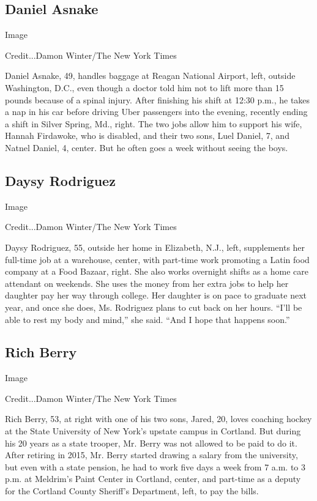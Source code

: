 \hypertarget{daniel-asnake}{%
\subsection{Daniel Asnake}\label{daniel-asnake}}

Image

Credit...Damon Winter/The New York Times

Daniel Asnake, 49, handles baggage at Reagan National Airport, left,
outside Washington, D.C., even though a doctor told him not to lift more
than 15 pounds because of a spinal injury. After finishing his shift at
12:30 p.m., he takes a nap in his car before driving Uber passengers
into the evening, recently ending a shift in Silver Spring, Md., right.
The two jobs allow him to support his wife, Hannah Firdawoke, who is
disabled, and their two sons, Luel Daniel, 7, and Natnel Daniel, 4,
center. But he often goes a week without seeing the boys.

\hypertarget{daysy-rodriguez}{%
\subsection{Daysy Rodriguez}\label{daysy-rodriguez}}

Image

Credit...Damon Winter/The New York Times

Daysy Rodriguez, 55, outside her home in Elizabeth, N.J., left,
supplements her full-time job at a warehouse, center, with part-time
work promoting a Latin food company at a Food Bazaar, right. She also
works overnight shifts as a home care attendant on weekends. She uses
the money from her extra jobs to help her daughter pay her way through
college. Her daughter is on pace to graduate next year, and once she
does, Ms. Rodriguez plans to cut back on her hours. ``I'll be able to
rest my body and mind,'' she said. ``And I hope that happens soon.''

\hypertarget{rich-berry}{%
\subsection{Rich Berry}\label{rich-berry}}

Image

Credit...Damon Winter/The New York Times

Rich Berry, 53, at right with one of his two sons, Jared, 20, loves
coaching hockey at the State University of New York's upstate campus in
Cortland. But during his 20 years as a state trooper, Mr. Berry was not
allowed to be paid to do it. After retiring in 2015, Mr. Berry started
drawing a salary from the university, but even with a state pension, he
had to work five days a week from 7 a.m. to 3 p.m. at Meldrim's Paint
Center in Cortland, center, and part-time as a deputy for the Cortland
County Sheriff's Department, left, to pay the bills.

